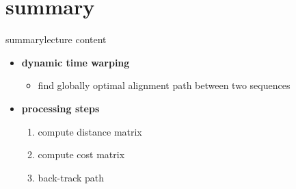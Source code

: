     
    \section{summary}
        \begin{frame}{summary}{lecture content}
            \begin{itemize}
                \item   \textbf{dynamic time warping}
                    \begin{itemize}
                        \item   find globally optimal alignment path between two sequences
                    \end{itemize}
                \bigskip
                \item   \textbf{processing steps}
                    \begin{enumerate}
                        \item   compute distance matrix
                        \item   compute cost matrix
                        \item   back-track path
                    \end{enumerate}
            \end{itemize}
        \end{frame}

